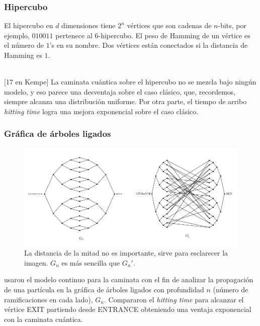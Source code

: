 \subsubsection*{Hipercubo}
El hipercubo en $d$ dimensiones tiene $2^n$ vértices que son cadenas de $n$-bits, por ejemplo, $010011$ pertenece al $6$-hipercubo. El peso de Hamming de un vértice es el número de $1$'s en su nombre. Dos vértices están conectados si la distancia de Hamming es $1$.

\cite{marquezino2008mixing}\\

[17 en Kempe] La caminata cuántica sobre el hipercubo no se mezcla bajo ningún modelo, y eso parece una desventaja sobre el caso clásico, que, recordemos, siempre alcanza una distribución uniforme. Por otra parte, el tiempo de arribo \textit{hitting time} logra una mejora exponencial sobre el caso clásico. 

\subsubsection*{Gráfica de árboles ligados}

\begin{figure}[ht]
\centering
\includegraphics[width=1\textwidth]{Kap4/GluedTreesChilds.png}
\caption{La distancia de la mitad no es importante, sirve para esclarecer la imagen.  $G_n$ es más sencilla que $G_n'$. 
\label{gr:Gn}\cite{childs2003exponential}}
\end{figure}
\cite{childs2003exponential} usaron el modelo continuo para la caminata con el fin de analizar la propagación de una partícula en la gráfica de árboles ligados con profundidad $n$ (número de ramificaciones en cada lado), $G_n$. Compararon el \textit{hitting time} para alcanzar el vértice EXIT partiendo desde ENTRANCE obteniendo una ventaja exponencial con la caminata cuántica.

